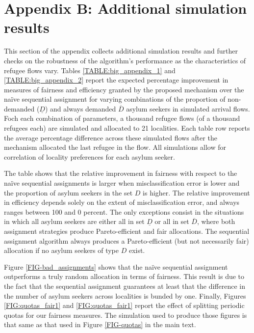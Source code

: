 \documentclass[12pt,fleqn]{article}
\begin{document}
\section*{Appendix B: Additional simulation results}

This section of the appendix collects additional simulation results and further checks on the robustness of the algorithm's performance as the characteristics of refugee flows vary. Tables \ref{TABLE:big_appendix_1} and \ref{TABLE:big_appendix_2} report the expected percentage improvement in measures of fairness and efficiency granted by the proposed mechanism over the na\"{i}ve sequential assignment for varying combinations of the proportion of non-demanded ($\underline{D}$) and always demanded $\overline{D}$ asylum seekers in simulated arrival flows. Foch each combination of parameters, a thousand refugee flows (of a thousand refugees each) are simulated and allocated to 21 localities. Each table row reports the average percentage difference across these simulated flows after the mechanism allocated the last refugee in the flow. All simulations allow for correlation of locality preferences for each asylum seeker.

The table shows that the relative improvement in fairness with respect to the na\"{i}ve sequential assignments is larger when misclassification error is lower and the proportion of asylum seekers in the set $D$ is higher. The relative improvement in efficiency depends solely on the extent of misclassification error, and always ranges between 100 and 0 percent. The only exceptions consist in the situations in which all asylum seekers are either all in set $\underline{D}$ or all in set $\overline{D}$, where both assignment strategies produce Pareto-efficient and fair allocations. The sequential assignment algorithm always produces a Pareto-efficient (but not necessarily fair) allocation if no asylum seekers of type $D$ exist.

Figure \ref{FIG-bad_assignments} shows that the na\"{i}ve sequential assignment outperforms a truly random allocation in terms of fairness. This result is due to the fact that the sequential assignment guarantees at least that the difference in the number of asylum seekers across localities is bunded by one. Finally, Figures \ref{FIG:quotas_fair1} and \ref{FIG:quotas_fair1} report the effect of splitting periodic quotas for our fairness measures. The simulation used to produce those figures is that same as that used in Figure \ref{FIG-quotas} in the main text.  
\end{document}
